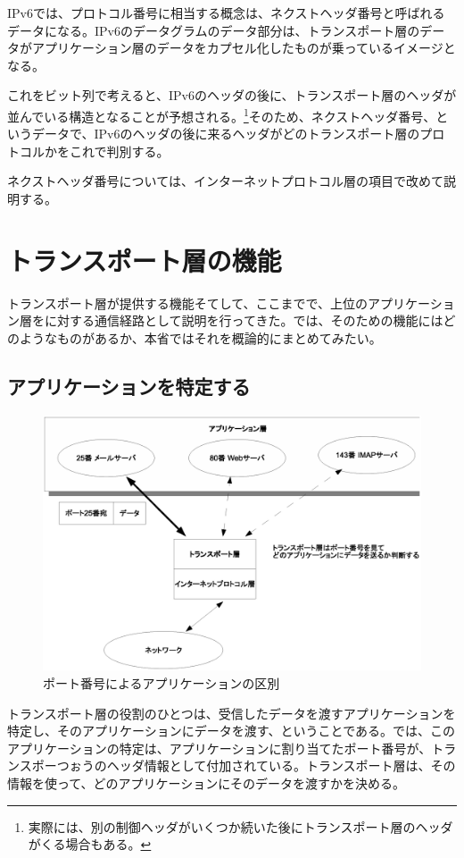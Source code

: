 IPv6では、プロトコル番号に相当する概念は、ネクストヘッダ番号と呼ばれるデータになる。IPv6のデータグラムのデータ部分は、トランスポート層のデータがアプリケーション層のデータをカプセル化したものが乗っているイメージとなる。

これをビット列で考えると、IPv6のヘッダの後に、トランスポート層のヘッダが並んでいる構造となることが予想される。\footnote{実際には、別の制御ヘッダがいくつか続いた後にトランスポート層のヘッダがくる場合もある。}そのため、ネクストヘッダ番号、というデータで、IPv6のヘッダの後に来るヘッダがどのトランスポート層のプロトコルかをこれで判別する。

ネクストヘッダ番号については、インターネットプロトコル層の項目で改めて説明する。

\section{トランスポート層の機能}

トランスポート層が提供する機能そてして、ここまでで、上位のアプリケーション層をに対する通信経路として説明を行ってきた。では、そのための機能にはどのようなものがあるか、本省ではそれを概論的にまとめてみたい。

\subsection{アプリケーションを特定する}

\begin{figure}[htbp]
	\includegraphics[width=12cm,clip]{draw/portnumber.eps}
	\caption{ポート番号によるアプリケーションの区別}
	\label{fig:pseudo6}
\end{figure}

トランスポート層の役割のひとつは、受信したデータを渡すアプリケーションを特定し、そのアプリケーションにデータを渡す、ということである。では、このアプリケーションの特定は、アプリケーションに割り当てたポート番号が、トランスポーつぉうのヘッダ情報として付加されている。トランスポート層は、その情報を使って、どのアプリケーションにそのデータを渡すかを決める。

